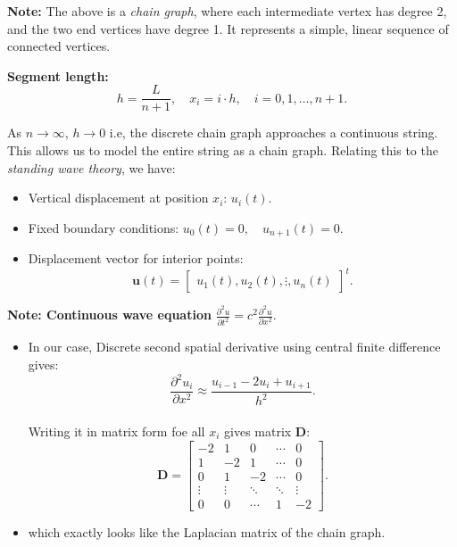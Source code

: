 \documentclass[aspectratio=169]{beamer}
\begin{document}
\begin{frame}

\textbf{Note:} The above is a \textit{chain graph}, where each intermediate vertex has degree 2, and the two end vertices have degree 1. It represents a simple, linear sequence of connected vertices.

\vspace{0.3cm}

\textbf{Segment length:}
\[
h = \frac{L}{n+1}, \quad x_i = i \cdot h, \quad i = 0, 1, \dots, n+1.
\]

As \( n \to \infty \), \( h \to 0 \) i.e, the discrete chain graph approaches a continuous string. \\
This allows us to model the entire string as a chain graph. Relating this to the \textit{standing wave theory}, we have:

\begin{itemize}
    \item Vertical displacement at position \( x_i \): \( u_i(t) \).
    \item Fixed boundary conditions: \( u_0(t) = 0, \quad u_{n+1}(t) = 0 \).
    \item Displacement vector for interior points:
    \[
    \mathbf{u}(t) = \begin{bmatrix} u_1(t), u_2(t), \vdots, u_n(t) \end{bmatrix}^t.
    \]
\end{itemize}

\end{frame}

\begin{frame}
    
        \textbf{Note: Continuous wave equation } \(
        \frac{\partial^2 u}{\partial t^2} = c^2 \frac{\partial^2 u}{\partial x^2}.  \)
    \begin{itemize}
        \item In our case, Discrete second spatial derivative using central finite difference gives:
        \[
        \frac{\partial^2 u_i}{\partial x^2} \approx \frac{u_{i-1} - 2u_i + u_{i+1}}{h^2}.
        \]
        \\
         Writing it in matrix form foe all \(x_i\) gives matrix \( \mathbf{D} \):
        \[
        \mathbf{D} = \begin{bmatrix}
            -2 & 1 & 0 & \cdots & 0 \\
            1 & -2 & 1 & \cdots & 0 \\
            0 & 1 & -2 & \cdots & 0 \\
            \vdots & \vdots & \ddots & \ddots & \vdots \\
            0 & 0 & \cdots & 1 & -2
        \end{bmatrix}.
        \]
        \item which exactly looks like the Laplacian matrix of the chain graph.
    \end{itemize}
\end{frame}
\end{document}
